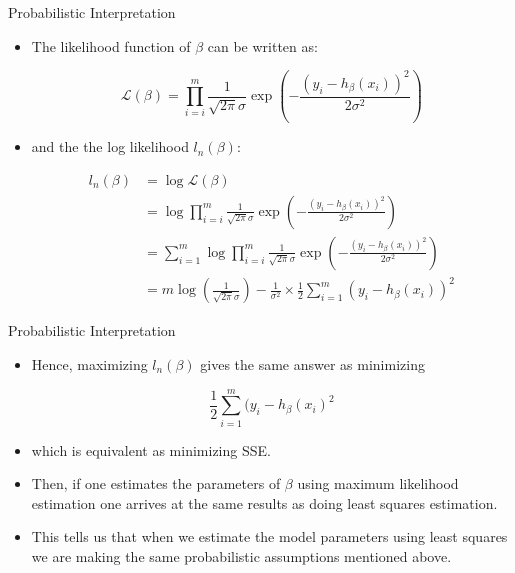 \documentclass[handout]{beamer}
\begin{document}
\begin{frame}{Probabilistic Interpretation}
\scriptsize{
\begin{itemize}



 \item The likelihood function of $\beta$ can be written as:
 
 \begin{displaymath}
  \mathcal{L}(\beta) = \prod_{i=i}^{m}\frac{1}{\sqrt{2\pi} \sigma} \exp \left(- \frac{(y_i - h_{\beta}(x_{i}) )^{2}}{2\sigma^2}\right)
 \end{displaymath}

 \item and the the log likelihood $l_n(\beta)$:
 
   \begin{align}
l_n(\beta)  & =  \log  \mathcal{L}(\beta) \\
 & = \log \prod_{i=i}^{m}\frac{1}{\sqrt{2\pi} \sigma} \exp \left(- \frac{(y_i - h_{\beta}(x_{i}) )^{2}}{2\sigma^2}\right) \\
  & = \sum_{i=1}^m  \log \prod_{i=i}^{m}\frac{1}{\sqrt{2\pi} \sigma} \exp \left(- \frac{(y_i - h_{\beta}(x_{i}) )^{2}}{2\sigma^2}\right) \\
    & = m \log\left(\frac{1}{\sqrt{2\pi} \sigma}\right) - \frac{1}{\sigma^2}\times \frac{1}{2}\sum_{i=1}^m(y_i - h_{\beta}(x_{i}) )^{2}  
 \end{align}
 

\end{itemize}


}
 
\end{frame}


\begin{frame}{Probabilistic Interpretation}
\scriptsize{
\begin{itemize}



 \item Hence, maximizing $l_n(\beta)$ gives the same answer as minimizing
 
 \begin{displaymath}
\frac{1}{2}\sum_{i=1}^m(y_i - h_{\beta}(x_{i})^{2}
 \end{displaymath}

 \item which is equivalent as minimizing SSE.
 
 \item  Then, if one estimates the parameters of $\beta$ using maximum likelihood estimation one arrives at the same results as doing least squares estimation.
 \item This tells us that when we estimate the model parameters using least squares we are making the same probabilistic assumptions mentioned above.

\end{itemize}


}
 
\end{frame}
\end{document}
